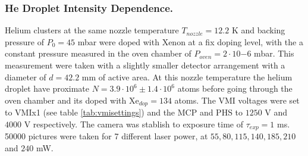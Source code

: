 
\subsubsection{He Droplet  Intensity Dependence.}

Helium clusters at the same nozzle temperature $T_{nozzle}=12.2$ K and backing pressure of $P_{0}=45$ mbar were doped with Xenon at a fix doping level, with the a constant pressure measured in the oven chamber of $P_{oven}=2\cdot 10{-6}$ mbar. This measurement were taken with a slightly smaller detector arrangement with a diameter of $d=42.2$ mm of active area. At this nozzle temperature the helium droplet have proximate $N=3.9\cdot 10^{6}\pm 1.4\cdot 10^{6}$  atoms before going through the oven chamber and its doped with Xe$_{dop}=134$ atoms. The VMI voltages were set to VMIx1 (see table \ref{tab:vmisettings}) and the MCP and PHS to $1250$ V and $4000$ V respectively. The camera was stablish to exposure time of $\tau_{exp}=1$ ms. 50000 pictures were taken for 7 different laser power, at $55,80,115,140,185,210$ and $240$ mW. 

